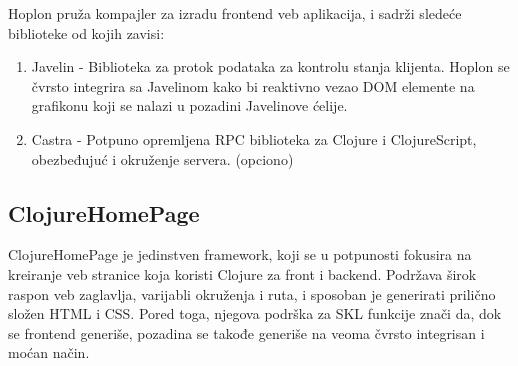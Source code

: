 Hoplon pruža kompajler za izradu frontend veb aplikacija, i  sadrži sledeće biblioteke od kojih zavisi:\cite{hoplon_wiki}
    \begin{enumerate}
        \item Javelin -
        Biblioteka za protok podataka za kontrolu stanja klijenta. Hoplon se čvrsto
        integrira sa Javelinom kako bi reaktivno vezao DOM elemente na grafikonu koji se nalazi u pozadini
        Javelinove ćelije.
        \item Castra -
        Potpuno opremljena RPC biblioteka za Clojure i ClojureScript, obezbeđujuć i
        okruženje servera. (opciono)
    \end{enumerate}

\subsection{ClojureHomePage}
\label{subsec:clojurehomepage}
ClojureHomePage je jedinstven framework, koji se u potpunosti fokusira na kreiranje veb stranice koja koristi Clojure za front i backend.
Podržava širok raspon veb zaglavlja, varijabli okruženja i ruta, i sposoban je generirati prilično složen HTML i CSS. 
Pored toga, njegova podrška za SKL funkcije znači da, dok se frontend generiše, pozadina se takođe generiše na veoma čvrsto integrisan i moćan način.\cite{frameworks}
